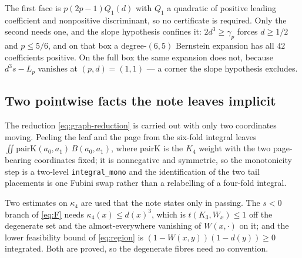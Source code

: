 \documentclass[11pt]{article}
\begin{document}
The first face is $p(2p-1)Q_1(d)$ with $Q_1$ a quadratic of positive leading
coefficient and nonpositive discriminant, so no certificate is required.  Only
the second needs one, and the slope hypothesis confines it: $2d^{3}\geq\gamma_p$
forces $d\geq1/2$ and $p\leq5/6$, and on that box a degree-$(6,5)$ Bernstein
expansion has all $42$ coefficients positive.  On the full box the same
expansion does not, because $d^{3}s-L_p$ vanishes at $(p,d)=(1,1)$ --- a corner
the slope hypothesis excludes.

\subsection{Two pointwise facts the note leaves implicit}

The reduction \eqref{eq:graph-reduction} is carried out with only two
coordinates moving.  Peeling the leaf and the page from the six-fold integral
leaves $\iint \mathrm{pairK}(a_0,a_1)\,B(a_0,a_1)$, where $\mathrm{pairK}$ is
the $K_4$ weight with the two page-bearing coordinates fixed; it is nonnegative
and symmetric, so the monotonicity step is a two-level \texttt{integral\_mono}
and the identification of the two tail placements is one Fubini swap rather
than a relabelling of a four-fold integral.

Two estimates on $\kappa_4$ are used that the note states only in passing.  The
$s<0$ branch of \eqref{eq:F} needs $\kappa_4(x)\leq d(x)^{3}$, which is
$t(K_3,W_x)\leq1$ off the degenerate set and the almost-everywhere vanishing of
$W(x,\cdot)$ on it; and the lower feasibility bound of \eqref{eq:region} is
$(1-W(x,y))(1-d(y))\geq0$ integrated.  Both are proved, so the degenerate
fibres need no convention.
\end{document}
